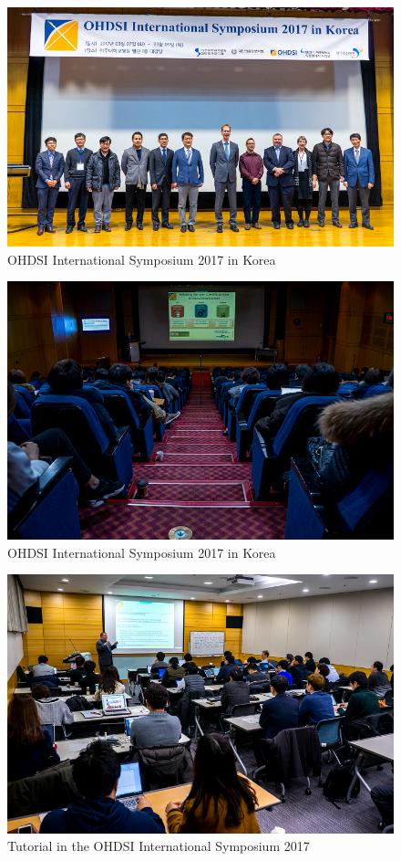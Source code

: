 \documentclass[11pt]{book}
\theoremstyle{definition}
\theoremstyle{definition}
\theoremstyle{definition}
\theoremstyle{remark}
\begin{document}
\begin{figure}
\includegraphics[width=0.8\linewidth]{images/OhdsiCommunity/DSC01956} \caption{OHDSI International Symposium 2017 in Korea}\label{fig:OHDSIInternationalSymposium2017inKorea1}
\end{figure}\begin{figure}
\includegraphics[width=0.8\linewidth]{images/OhdsiCommunity/DSC01861} \caption{OHDSI International Symposium 2017 in Korea}\label{fig:OHDSIInternationalSymposium2017inKorea1}
\end{figure}

\begin{figure}
\includegraphics[width=0.8\linewidth]{images/OhdsiCommunity/DSC02166} \caption{Tutorial in the OHDSI International Symposium 2017}\label{fig:OHDSIInternationalSymposium2017inKorea2}
\end{figure}
\end{document}
